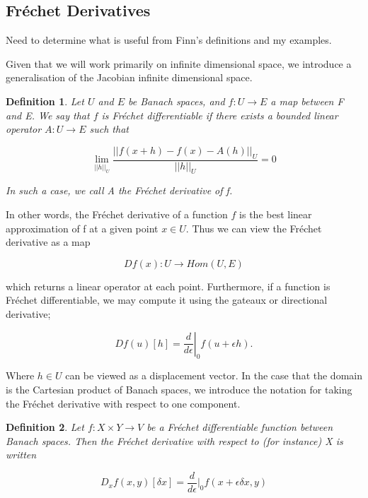\documentclass{article}
\newtheorem{definition}{Definition}
\newcommand{\ep}{\epsilon}
\begin{document}
\subsection{Fr\'echet Derivatives}
Need to determine what is useful from Finn's definitions and my examples. 
{\color{blue}
Given that we will work primarily on infinite dimensional space, we introduce a generalisation of the Jacobian infinite dimensional space.

\begin{definition}
    Let $U$ and $E$ be Banach spaces, and $f:U \to E$ a map between F and E. We say that $f$ is Fr\'echet differentiable if there exists a bounded linear operator $A: U\to E$ such that

    \begin{equation}
    \lim_{||h||_U}\frac{||f(x+h)-f(x) - A(h)||_U}{||h||_U} = 0 
    \end{equation}

   In such a case, we call A the Fr\'echet derivative of f. 
\end{definition}

In other words, the Fr\'echet derivative of a function $f$ is the best linear approximation of f at a given point $x\in U$. Thus we can view the Fr\'echet derivative as a map

\begin{equation}
    Df(x): U\to Hom(U,E)
\end{equation}

which returns a linear operator at each point. Furthermore, if a function is Fr\'echet differentiable, we may compute it using the gateaux or directional derivative;

\begin{equation} 
    Df(u)[h] = \left. \frac{d}{d\ep} \right|_0 f(u+\ep h). 
\end{equation}

Where $h\in U$ can be viewed as a displacement vector. In the case that the domain is the Cartesian product of Banach spaces, we introduce the notation for taking the Fr\'echet derivative with respect to one component.

\begin{definition}
    Let $f:X\times Y \to V $ be a Fr\'echet differentiable function between Banach spaces. Then the Fr\'echet derivative with respect to (for instance) X is written

\begin{equation}
    D_xf(x,y)[\delta x] = \frac{d}{d\ep} \bigg|_0 f(x + \ep\delta x, y) 
\end{equation}
\end{definition} 
}
\end{document}
